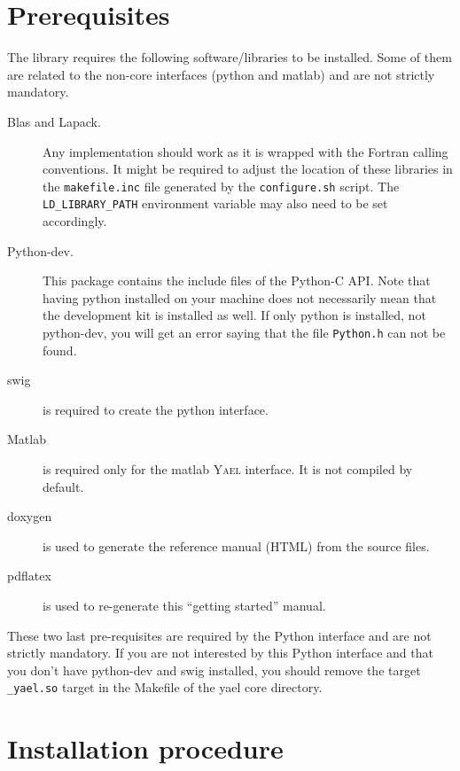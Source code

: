 \documentclass[a4paper,11pt,notitlepage,final,twoside]{report}
\newcommand{\yael}{\textsc{Yael}\xspace}
\newcommand{\tc}[1]{\texttt{#1}}
\begin{document}
\section{Prerequisites}

The library requires the following software/libraries to be installed. 
Some of them are related to the non-core interfaces (python and matlab) 
and are not strictly mandatory. 

\begin{description}
\item [Blas and Lapack.] Any implementation should work as it is
wrapped with the Fortran calling conventions. 
It might be required to adjust the location of these libraries in 
the \tc{makefile.inc} file generated by the \tc{configure.sh} script. 
The \tc{LD\_LIBRARY\_PATH} environment variable may also need to be set accordingly. 

\item [Python-dev.] This package contains the include files of the Python-C API. 
Note that having python installed on your machine does not necessarily 
mean that the development kit is installed as well. 
If only python is installed, not python-dev, you will get an error 
saying that the file \tc{Python.h} can not be found. 

\item [swig] 
is required to create the python interface. 

\item [Matlab] is required only for the matlab \yael interface. 
It is not compiled by default. 


\item [doxygen] is used to generate the reference manual (HTML) from the source files. 

\item [pdflatex] is used to re-generate this ``getting started'' manual. 
\end{description}


These two last pre-requisites are required by the Python interface 
and are not strictly mandatory. If you are not interested by this 
Python interface and that you don't have python-dev and swig installed, 
you should remove the target \tc{\_yael.so} target in the Makefile of the 
yael core directory. 


\section{Installation procedure}
\end{document}
